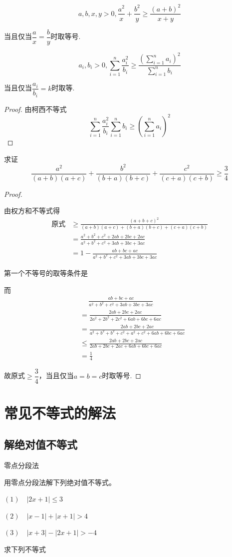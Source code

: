 \begin{theorem}[权方和不等式]
    \[a,b,x,y>0,\frac{a^2}{x}+\frac{b^2}{y}\geq\frac{(a+b)^2}{x+y}\]
    
    当且仅当$\dfrac{a}{x}=\dfrac{b}{y}$时取等号.

    \[a_i,b_i>0,\sum_{i=1}^{n}\frac{a_i^2}{b_i}\geq\frac{(\sum_{i=1}^{n}a_i)^2}{\sum_{i=1}^{n}b_i}\]

    当且仅当$\dfrac{a_i}{b_i}=k$时取等.
\end{theorem}
\begin{proof}
    由柯西不等式
    \[\sum_{i=1}^{n}\frac{a_i^2}{b_i}\sum_{i=1}^{n}b_i\geq(\sum_{i=1}^{n}a_i)^2\]
\end{proof}
\begin{example}
    求证\[\frac{a^2}{(a+b)(a+c)}+\frac{b^2}{(b+a)(b+c)}+\frac{c^2}{(c+a)(c+b)}\geq \frac{3}{4}\]
\end{example}
\begin{proof}
        \ 
        
        由权方和不等式得
        \begin{align*}
        \text{原式}&\geq \frac{(a+b+c)^2}{(a+b)(a+c)+(b+a)(b+c)+(c+a)(c+b)}\\   
                 &=\frac{a^2+b^2+c^2+2ab+2bc+2ac}{a^2+b^2+c^2+3ab+3bc+3ac}\\
                 &=1-\frac{ab+bc+ac}{a^2+b^2+c^2+3ab+3bc+3ac}
        \end{align*}
        
        第一个不等号的取等条件是
        
        而
        \begin{align*}
        &\quad\ \frac{ab+bc+ac}{a^2+b^2+c^2+3ab+3bc+3ac}\\
        &=\frac{2ab+2bc+2ac}{2a^2+2b^2+2c^2+6ab+6bc+6ac}\\
        &=\frac{2ab+2bc+2ac}{a^2+b^2+b^2+c^2+a^2+c^2+6ab+6bc+6ac}\\
        &\leq \frac{2ab+2bc+2ac}{2ab+2bc+2ac+6ab+6bc+6ac}\\
        &=\frac{1}{4}
        \end{align*}
        
        故原式$\geq \dfrac{3}{4}$，当且仅当$a=b=c$时取等号.
        
\end{proof}
\clearpage
\section{常见不等式的解法}
\subsection{解绝对值不等式}
零点分段法
\begin{example}
    用零点分段法解下列绝对值不等式。

    $(1)\quad|2x+1|\leq 3$

    $(2)\quad|x-1|+|x+1|>4$

    $(3)\quad|x+3|-|2x+1|>-4$
\end{example}
\begin{example}
    求下列不等式
\end{example}
\clearpage

